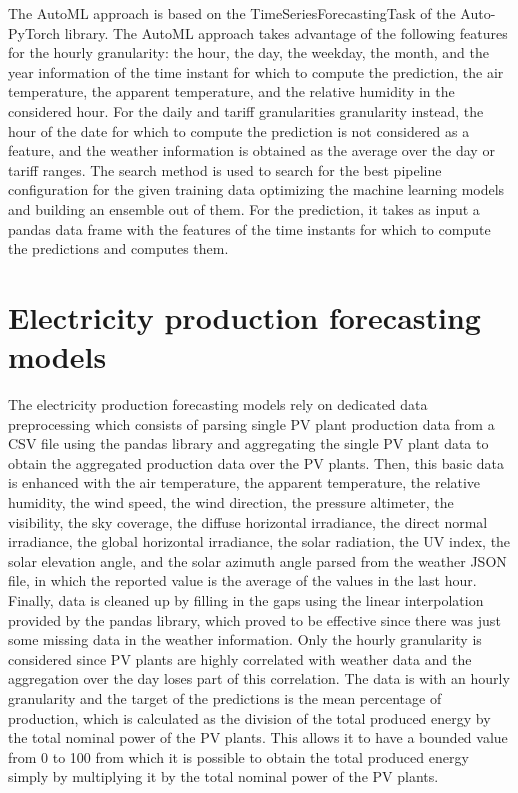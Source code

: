 The AutoML approach is based on the TimeSeriesForecastingTask of the Auto-PyTorch library.
The AutoML approach takes advantage of the following features for the hourly granularity: the hour, the day, the weekday, the month, and the year information of the time instant for which to compute the prediction, the air temperature, the apparent temperature, and the relative humidity in the considered hour.
For the daily and tariff granularities granularity instead, the hour of the date for which to compute the prediction is not considered as a feature, and the weather information is obtained as the average over the day or tariff ranges.
The search method is used to search for the best pipeline configuration for the given training data optimizing the machine learning models and building an ensemble out of them.
For the prediction, it takes as input a pandas data frame with the features of the time instants for which to compute the predictions and computes them.


\section{Electricity production forecasting models}
\label{sec:productionimpl}
\vspace{0.2 cm}

The electricity production forecasting models rely on dedicated data preprocessing which consists of parsing single PV plant production data from a CSV file using the pandas library and aggregating the single PV plant data to obtain the aggregated production data over the PV plants.
Then, this basic data is enhanced with the air temperature, the apparent temperature, the relative humidity, the wind speed, the wind direction, the pressure altimeter, the visibility, the sky coverage, the diffuse horizontal irradiance, the direct normal irradiance, the global horizontal irradiance, the solar radiation, the UV index, the solar elevation angle, and the solar azimuth angle parsed from the weather JSON file, in which the reported value is the average of the values in the last hour.
Finally, data is cleaned up by filling in the gaps using the linear interpolation provided by the pandas library, which proved to be effective since there was just some missing data in the weather information.
Only the hourly granularity is considered since PV plants are highly correlated with weather data and the aggregation over the day loses part of this correlation.
The data is with an hourly granularity and the target of the predictions is the mean percentage of production, which is calculated as the division of the total produced energy by the total nominal power of the PV plants.
This allows it to have a bounded value from 0 to 100 from which it is possible to obtain the total produced energy simply by multiplying it by the total nominal power of the PV plants.


